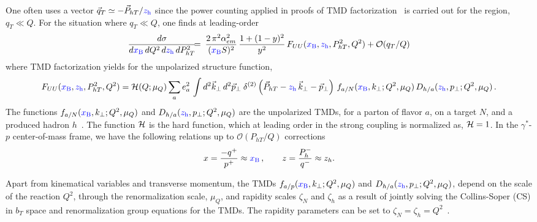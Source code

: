 \documentclass[final,3p,times,onecolumn,sort&compress,hidelinks]{elsarticle}
\newcommand{\xbj}{\ensuremath{{\cbl x_{\rm B}}}}
\newcommand{\zh}{\ensuremath{{\cbl z_{\rm h}}}}
\newcommand\3[1]{\boldsymbol{#1}}
\newcommand{\cbl}{\color{blue}}
\begin{document}
One often uses a vector $\vec{q}_T \simeq -\vec{P}_{hT}/\zh$
 since the power counting applied in proofs of  TMD factorization~\cite{Collins:2011zzd} is carried out for the region, $q_T \ll Q$.
For the situation where $q_{T}\ll Q$, one finds at leading-order~\cite{Bacchetta:2006tn}
\begin{eqnarray}
\frac{d\sigma}
{d\xbj\, dQ^2 \, d\zh \, dP_{hT}^2} &\!\!\!=\!\!\!&
\frac {2 \, \pi^2 \alpha_{em}^2}{(\xbj S)^2} \, \frac{ 1 + (1-y)^2 }{y^2}\,F_{UU}(\xbj,\zh,P_{hT}^2,Q^2) + \mathcal{O}(q_{T}/Q)
\label{e:dsigma}
\end{eqnarray}
where TMD factorization yields for the unpolarized structure function\cite{Collins:2011zzd},
\begin{equation}
F_{UU}(\xbj,\zh,P_{hT}^2,Q^2)  = {\cal H} (Q; \mu_Q)\sum_{a} e_a^2 \,
\int d^2\vec{k}_\perp \, d^2\vec{p}_\perp
\> \delta ^{(2)}\left(\vec{P}_{hT} - \zh\,\vec{k}_\perp -\vec{p}_\perp \right)\,
f_{a/N} (\xbj, k_{\perp}; Q^2, \mu_Q) \, D_{h/a}(\zh, p_{\perp}; Q^2, \mu_Q)\,. \label{e:FUU} \\
\end{equation}
The functions $f_{a/N} (\xbj, k_{\perp}; Q^2, \mu_Q)$ and $D_{h/a}(\zh, p_{\perp}; Q^2, \mu_Q)$ are the unpolarized  TMDs,  for a parton of flavor
$a$, on a  target $N$, and a produced hadron $h$~\cite{Bacchetta:2006tn,Collins:2011zzd}.  The function ${\cal H}$ is the  hard function, which at leading order in the strong coupling
is normalized as, ${\cal H} = 1$.  In the $\gamma^*$-$p$ center-of-mass frame, we have the following relations up to $\mathcal{O}(P_{hT}/Q)$
corrections~\cite{Bacchetta:2006tn}
\begin{equation}
  x=\frac{-q^+}{p^+}\approx \xbj\,, \quad\quad z=\frac{P_h^-}{q^-}\approx z_h.
  \label{e:LT_relations}
\end{equation}







 Apart from kinematical variables and transverse momentum, the TMDs  $f_{a/p} (\xbj, k_{\perp}; Q^2, \mu_Q)$ and $D_{h/a}(\zh, p_{\perp}; Q^2, \mu_Q)$, 
depend on the scale of the reaction $Q^2$,  through  the renormalization scale, $\mu_Q$, and  rapidity scales  $\zeta_N$ and $\zeta_h$ as a result of  jointly solving the Collins-Soper (CS) in $b_T$ space  and renormalization group equations for the TMDs.  The rapidity parameters can be set to $\zeta_N=\zeta_h=Q^2$~\cite{Collins:2011zzd,Collins:2014jpa}.
\end{document}
